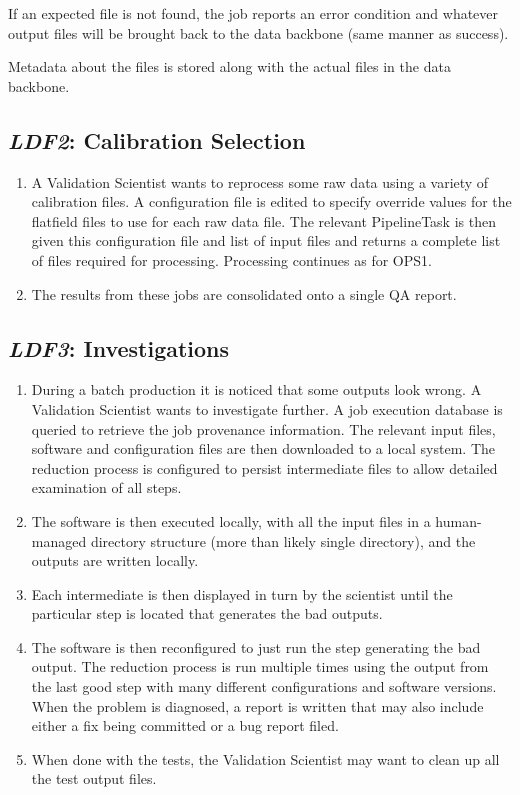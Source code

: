\documentclass[DM,toc,lsstdraft]{lsstdoc}
\newcommand{\usecase}[3]{%
\subsection{\emph{#1}: #2}
\label{use:#1}
\begin{enumerate}[label=\alph*.]
#3
\end{enumerate}
}
\begin{document}
{\item
If an expected file is not found, the job reports an error condition and whatever output files will be brought back to the data backbone (same manner as success).

\item
Metadata about the files is stored along with the actual files in the data backbone.

}

\usecase{LDF2}{Calibration Selection}{%

\item
A Validation Scientist wants to reprocess some raw data using a variety of calibration files.
A configuration file is edited to specify override values for the flatfield files to use for each raw data file.
The relevant PipelineTask is then given this configuration file and list of input files and returns a complete list of files required for processing.
Processing continues as for OPS1.

\item
The results from these jobs are consolidated onto a single QA report.

}

\usecase{LDF3}{Investigations}{%

\item
During a batch production it is noticed that some outputs look wrong.
A Validation Scientist wants to investigate further.
A job execution database is queried to retrieve the job provenance information.
The relevant input files, software and configuration files are then downloaded to a local system.
The reduction process is configured to persist intermediate files to allow detailed examination of all steps.

\item
The software is then executed locally, with all the input files in a human-managed directory structure (more than likely single directory), and the outputs are written locally.

\item
Each intermediate is then displayed in turn by the scientist until the particular step is located that generates the bad outputs.

\item
The software is then reconfigured to just run the step generating the bad output.
The reduction process is run multiple times using the output from the last good step with many different configurations and software versions.
When the problem is diagnosed, a report is written that may also include either a fix being committed or a bug report filed.

\item
When done with the tests, the Validation Scientist may want to clean up all the test output files.

}
\end{document}
